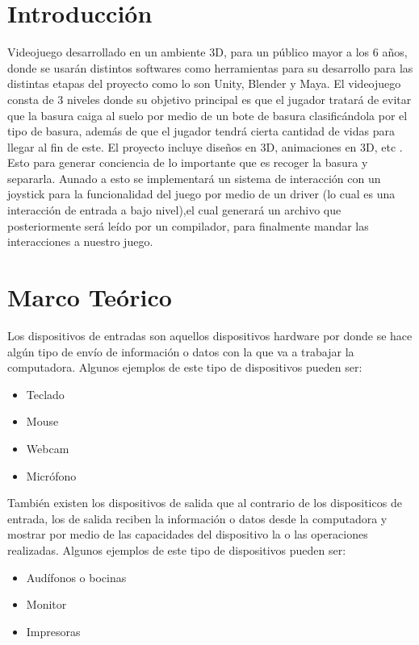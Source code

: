 \documentclass[preprint,12pt]{elsarticle}
\begin{document}

\section{Introducción} %
\label{sec:intro}
Videojuego desarrollado en un ambiente 3D, para un público mayor a los 6 años, donde se usarán distintos softwares como herramientas para su desarrollo para las distintas etapas del proyecto como lo son Unity, Blender y Maya. El videojuego consta de 3 niveles donde su objetivo principal es que el jugador tratará de evitar que la basura caiga al suelo por medio de un bote de basura clasificándola por el tipo de basura, además de que el jugador tendrá cierta cantidad de  vidas para llegar al fin de este. El proyecto incluye diseños en 3D, animaciones en 3D, etc . Esto para generar conciencia de lo importante que es recoger la basura y separarla. Aunado a esto se implementará un sistema de interacción con un joystick para la funcionalidad del juego por medio de un driver (lo cual es una interacción de entrada a bajo nivel),el cual generará un archivo que posteriormente será leído por un compilador, para finalmente mandar las interacciones a nuestro juego.

\section{Marco Teórico} %
 Los dispositivos de entradas son aquellos dispositivos hardware por donde se hace algún tipo de envío de información o datos con la que va a trabajar la computadora. Algunos ejemplos de este tipo de dispositivos pueden ser:
    \begin{itemize}
        \item Teclado
        \item Mouse
        \item Webcam
        \item Micrófono
    \end{itemize} \newline
También existen los dispositivos de salida que al contrario de los dispositicos de entrada, los de salida reciben la información o datos desde la computadora y mostrar por medio de las capacidades del dispositivo la o las operaciones realizadas.
Algunos ejemplos de este tipo de dispositivos pueden ser:
    \begin{itemize}
        \item Audífonos o bocinas
        \item Monitor
        \item Impresoras
    \end{itemize} \newline
\end{document}

